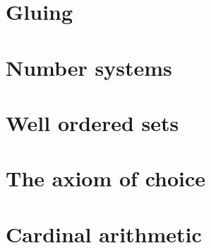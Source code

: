 \documentclass{article}
\begin{document}
\begin{multicols}{2}
    
    
    \noindent\section{Gluing}
    
    
    
    
    
    \noindent\section{Number systems}
    
    
    
    
    
    \noindent\section{Well ordered sets}
    
    
    
    
    \noindent\section{The axiom of choice}
    
    
    
    
    \noindent\section{Cardinal arithmetic}
    
    
    
    
  \end{multicols}
\end{document}

